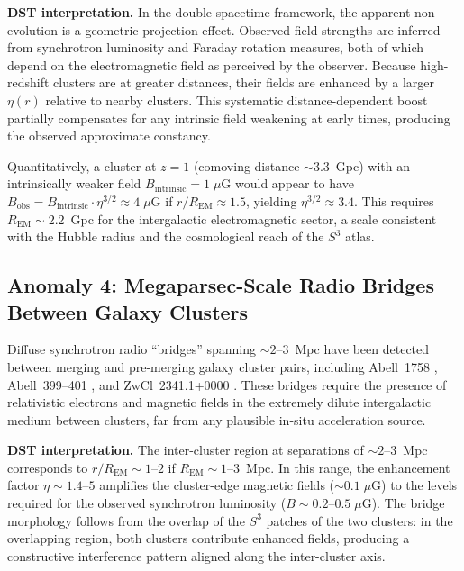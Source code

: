 \documentclass[a4paper]{article}
\begin{document}
\textbf{DST interpretation.} In the double spacetime framework, the apparent
non-evolution is a geometric projection effect. Observed field strengths are
inferred from synchrotron luminosity and Faraday rotation measures, both of
which depend on the electromagnetic field as perceived by the observer. Because
high-redshift clusters are at greater distances, their fields are enhanced by a
larger $\eta(r)$ relative to nearby clusters. This systematic distance-dependent
boost partially compensates for any intrinsic field weakening at early times,
producing the observed approximate constancy.

Quantitatively, a cluster at $z = 1$ (comoving distance $\sim 3.3$~Gpc) with an
intrinsically weaker field $B_{\text{intrinsic}} = 1\;\mu$G would appear to
have $B_{\text{obs}} = B_{\text{intrinsic}} \cdot \eta^{3/2} \approx 4\;\mu$G
if $r/R_{\text{EM}} \approx 1.5$, yielding $\eta^{3/2} \approx 3.4$. This
requires $R_{\text{EM}} \sim 2.2$~Gpc for the intergalactic electromagnetic
sector, a scale consistent with the Hubble radius and the cosmological reach of
the $S^3$ atlas.

\subsection{Anomaly 4: Megaparsec-Scale Radio Bridges Between Galaxy Clusters}
\label{subsec:bridges}

Diffuse synchrotron radio ``bridges'' spanning $\sim 2$--$3$~Mpc have been
detected between merging and pre-merging galaxy cluster pairs, including
Abell~1758 \cite{botteon2020bridge}, Abell~399--401 \cite{govoni2019},
and ZwCl~2341.1+0000 \cite{giovannini2010}. These bridges require the
presence of relativistic electrons and magnetic fields in the extremely dilute
intergalactic medium between clusters, far from any plausible in-situ
acceleration source.

\textbf{DST interpretation.} The inter-cluster region at separations of
$\sim 2$--$3$~Mpc corresponds to $r/R_{\text{EM}} \sim 1$--$2$ if
$R_{\text{EM}} \sim 1$--$3$~Mpc. In this range, the enhancement factor
$\eta \sim 1.4$--$5$ amplifies the cluster-edge magnetic fields
($\sim 0.1\;\mu$G) to the levels required for the observed synchrotron
luminosity ($B \sim 0.2$--$0.5\;\mu$G). The bridge morphology follows from the
overlap of the $S^3$ patches of the two clusters: in the overlapping region,
both clusters contribute enhanced fields, producing a constructive interference
pattern aligned along the inter-cluster axis.
\end{document}
